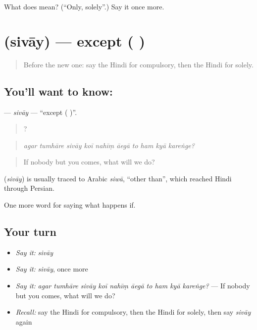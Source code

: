 \begin{tcolorbox}[breakable,colback=teal!4,colframe=teal!35!black,title={Before you move on}]
What does  mean? (\textquotedblleft{}Only, solely\textquotedblright{}.) Say it once more.
\end{tcolorbox}
\section[\texorpdfstring{\hi{सिवाय} (sivāy)}{सिवाय (sivāy)}]{ (sivāy) — except ( )}

\label{lesson:HI-C378-sivay}



\begin{quote}
Before the new one: say the Hindi for compulsory, then the Hindi for solely.
\end{quote}

\subsection*{You'll want to know: }
\textbf{} — \emph{sivāy} — \textquotedblleft{}except ( )\textquotedblright{}.

\begin{quote}
         ?
\end{quote}

\begin{quote}
\emph{agar tumhāre sivāy koī nahīṃ āegā to ham kyā kareṅge?}
\end{quote}

\begin{quote}
If nobody but you comes, what will we do?
\end{quote}

\begin{cousinweb}
\textbf{} (\emph{sivāy}) is usually traced to Arabic \emph{siwā}, \textquotedblleft{}other than\textquotedblright{}, which reached Hindi through Persian.
\end{cousinweb}

\begin{grammarlens}[title={What you've built}]
One more word for saying what happens if.
\end{grammarlens}

\subsection*{Your turn}
\begin{itemize}
\raggedright
  \item \emph{Say it:} \emph{sivāy}
  \item \emph{Say it:} \emph{sivāy}, once more
  \item \emph{Say it:} \emph{agar tumhāre sivāy koī nahīṃ āegā to ham kyā kareṅge?} — If nobody but you comes, what will we do?
  \item \emph{Recall:} say the Hindi for compulsory, then the Hindi for solely, then say \emph{sivāy} again
\end{itemize}

